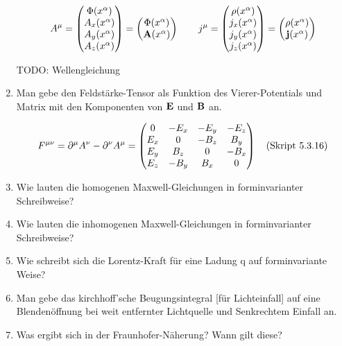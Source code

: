 \begin{enumerate}
      \begin{equation*}
        A^\mu=
        \begin{pmatrix}
          \Phi(x^\alpha) \\ A_x(x^\alpha) \\ A_y(x^\alpha) \\ A_z(x^\alpha)
        \end{pmatrix}
        =
        \begin{pmatrix}
          \Phi(x^\alpha) \\ \vb A(x^\alpha)
        \end{pmatrix}
        \qquad
        j^\mu =
        \begin{pmatrix}
          \rho(x^\alpha) \\ j_x(x^\alpha) \\ j_y(x^\alpha) \\ j_z(x^\alpha)
        \end{pmatrix}
        =
        \begin{pmatrix}
          \rho(x^\alpha) \\ \vb j(x^\alpha)
        \end{pmatrix}
      \end{equation*}

      TODO: Wellengleichung

    \item Man gebe den Feldstärke-Tensor als Funktion des Vierer-Potentials
      und Matrix mit den Komponenten von $\vb E$ und $\vb B$ an.

      \begin{equation*}
        F^{\mu\nu}=\partial^\mu A^\nu - \partial^\nu A^\mu=
        \begin{pmatrix}
          0   & -E_x & -E_y & -E_z\\ 
          E_x & 0    & -B_z & B_y \\ 
          E_y & B_z  & 0    & -B_x\\ 
          E_z & -B_y & B_x  & 0   \\ 
        \end{pmatrix}
      \quad\text{(Skript 5.3.16)}
      \end{equation*}

    \item Wie lauten die homogenen Maxwell-Gleichungen in forminvarianter
      Schreibweise?

    \item Wie lauten die inhomogenen Maxwell-Gleichungen in forminvarianter
      Schreibweise?

    \item Wie schreibt sich die Lorentz-Kraft für eine Ladung q auf
      forminvariante Weise?

    \item Man gebe das kirchhoff'sche Beugungsintegral [für
      Lichteinfall] auf eine Blendenöffnung bei weit 
      entfernter Lichtquelle und Senkrechtem Einfall an.

    \item Was ergibt sich in der Fraunhofer-Näherung? Wann gilt diese?

\end{enumerate}
